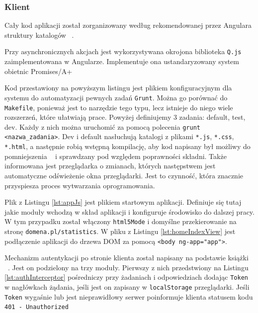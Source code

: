 \documentclass[10pt,titlepage]{article}
\begin{document}
\subsubsection{Klient}
\lstset{language=JavaScript}
\par Cały kod aplikacji został zorganizowany według rekomendowanej przez Angulara struktury katalogów ~\cite{angular:structure}.
\par Przy asynchronicznych akcjach jest wykorzystywana okrojona biblioteka \verb|Q.js| ~\cite{lib:q} zaimplementowana w Angularze. Implementuje ona ustandaryzowany system obietnic Promises/A+ ~\cite{doc:promises}

\par Kod przestawiony na powyższym listingu jest plikiem konfiguracyjnym dla systemu do automatyzacji pewnych zadań \verb|Grunt|. Można go porównać do \verb|Makefile|, ponieważ jest to narzędzie tego typu, lecz istnieje do niego wiele rozszerzeń, które ułatwiają prace. Powyżej definiujemy 3 zadania: default, test, dev. Każdy z nich można uruchomić za pomocą polecenia \verb|grunt <nazwa_zadania>|. Dev i default nasłuchują katalogi z plikami \verb|*.js|, \verb|*.css|, \verb|*.html|, a następnie robią wstępną kompilację, aby kod napisany był możliwy do pomniejszenia ~\cite{angular:minSafe} i sprawdzany pod względem poprawności składni. Także informowana jest przeglądarka o zmianach, których następstwem jest automatyczne odświeżenie okna przeglądarki. Jest to czynność, która znacznie przyspiesza proces wytwarzania oprogramowania.
\par Plik z Listingu \ref{lst:appJs} jest plikiem startowym aplikacji. Definiuje się tutaj jakie moduły wchodzą w skład aplikacji i konfiguruje środowisko do dalszej pracy. W tym przypadku został włączony \verb|html5Mode| i domyślne przekierowanie na stronę \verb|domena.pl/statistics|. W pliku z Listingu \ref{lst:homeIndexView} jest podłączenie aplikacji do drzewa DOM za pomocą \verb|<body ng-app="app">|.

Mechanizm autentykacji po stronie klienta został napisany na podstawie książki ~\cite{angular:bookMastering}. Jest on podzielony na trzy moduły. Pierwszy z nich przedstwiony na Listingu \ref{lst:authInterceptor} pośredniczy przy żadaniach \linebreak i odpowiedziach dodając \verb|Token| w nagłówkach żądania, jeśli jest on zapisany w \verb|localStorage| przeglądarki. Jeśli \verb|Token| wygaśnie lub jest nieprawidłowy serwer poinformuje klienta statusem kodu \verb|401 - Unauthorized| ~\cite{http:statuscodes}
\end{document}
